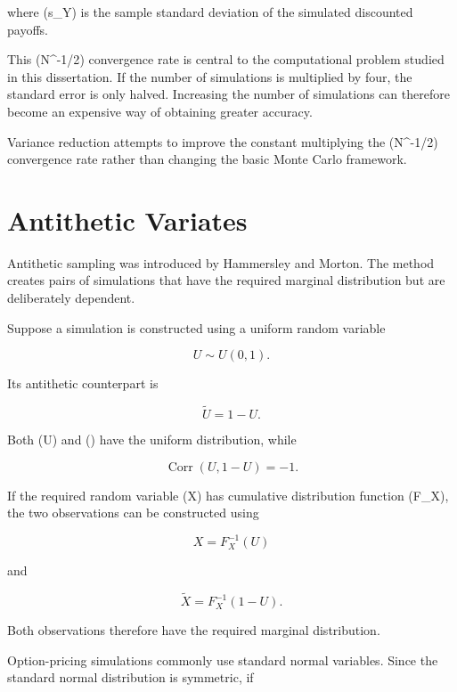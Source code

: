 \documentclass[12pt,a4paper]{report}
\begin{document}
where (s_Y) is the sample standard deviation of the simulated discounted payoffs.

This (N^{-1/2}) convergence rate is central to the computational problem studied in this dissertation. If the number of simulations is multiplied by four, the standard error is only halved. Increasing the number of simulations can therefore become an expensive way of obtaining greater accuracy.

Variance reduction attempts to improve the constant multiplying the (N^{-1/2}) convergence rate rather than changing the basic Monte Carlo framework.

\section{Antithetic Variates}

Antithetic sampling was introduced by Hammersley and Morton. The method creates pairs of simulations that have the required marginal distribution but are deliberately dependent.

Suppose a simulation is constructed using a uniform random variable

\begin{equation}
U\sim U(0,1).
\end{equation}

Its antithetic counterpart is

\begin{equation}
\widetilde{U}
=
1-U.
\end{equation}

Both (U) and () have the uniform distribution, while

\begin{equation}
\operatorname{Corr}(U,1-U)
=
-1.
\end{equation}

If the required random variable (X) has cumulative distribution function (F_X), the two observations can be constructed using

\begin{equation}
X
=
F_X^{-1}(U)
\end{equation}

and

\begin{equation}
\widetilde{X}
=
F_X^{-1}(1-U).
\end{equation}

Both observations therefore have the required marginal distribution.

Option-pricing simulations commonly use standard normal variables. Since the standard normal distribution is symmetric, if
\end{document}
